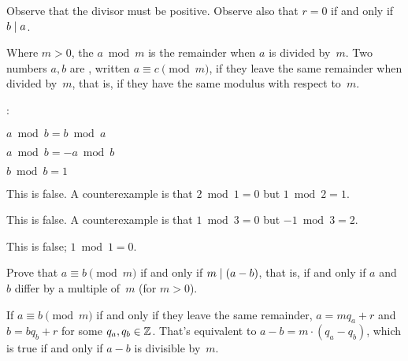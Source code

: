 \documentclass{test}  %
\begin{document}
\begin{problem}
\end{problem}

\noindent 
Observe that the divisor must be positive.
Observe also that $r=0$ if and only if $b\mid a$. 

\begin{df}
Where $m>0$, the  $a\bmod m$ 
is the remainder when $a$ is divided by~$m$.
Two numbers $a,b$ are , 
written $a\equiv c\pmod m$, 
if they leave the same remainder when divided by~$m$, that is,
if they have the same modulus with respect to~$m$.
\end{df}

\begin{problem}  \pord:
\begin{items}
\item $a\bmod b=b\bmod a$
\item $a\bmod b=-a\bmod b$
\item $b\bmod b=1$
\end{items}
\begin{ans}
\begin{exes}
\item This is false.
  A counterexample is that $2\bmod 1=0$ but $1\bmod 2=1$.
\item This is false.
  A counterexample is that $1\bmod 3=0$ but $-1\bmod 3=2$.
\item This is false;
  $1\bmod 1=0$.     
\end{exes}
\end{ans}
\end{problem}

\begin{problem} \label{ex:AEquivBpmodMIFFABDifferBYMultipleOfM}
Prove that $a\equiv b\pmod m$ if and only if $m\mid (a-b)$,
that is, if and only if $a$ and~$b$ differ by a multiple of~$m$
(for $m>0$).  
\begin{answer}
If $a\equiv b\pmod m$ if and only if they leave the same remainder,
$a=mq_a+r$ and~$b=bq_b+r$ for some $q_a,q_b\in\mathbb{Z}$.
That's equivalent to $a-b=m\cdot(q_a-q_b)$, 
which is true if and only if $a-b$ is divisible by~$m$.
\end{answer}
\end{problem}
\end{document}
